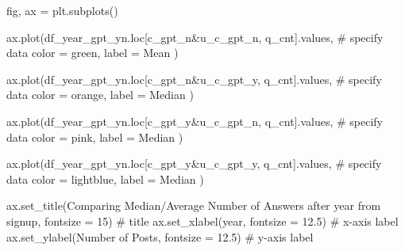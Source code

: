 \documentclass[
  letterpaper,
  DIV=11,
  numbers=noendperiod]{scrartcl}
\newenvironment{Shaded}{\begin{snugshade}}{\end{snugshade}}
\newcommand{\CommentTok}[1]{\textcolor[rgb]{0.37,0.37,0.37}{#1}}
\newcommand{\DecValTok}[1]{\textcolor[rgb]{0.68,0.00,0.00}{#1}}
\newcommand{\FloatTok}[1]{\textcolor[rgb]{0.68,0.00,0.00}{#1}}
\newcommand{\NormalTok}[1]{\textcolor[rgb]{0.00,0.23,0.31}{#1}}
\newcommand{\OperatorTok}[1]{\textcolor[rgb]{0.37,0.37,0.37}{#1}}
\newcommand{\StringTok}[1]{\textcolor[rgb]{0.13,0.47,0.30}{#1}}
\begin{document}
\begin{Shaded}
\begin{Highlighting}[]
\NormalTok{fig, ax }\OperatorTok{=}\NormalTok{ plt.subplots()}


\NormalTok{ax.plot(df\_year\_gpt\_yn.loc[c\_gpt\_n}\OperatorTok{\&}\NormalTok{u\_c\_gpt\_n, }\StringTok{\textquotesingle{}q\_cnt\textquotesingle{}}\NormalTok{].values, }\CommentTok{\# specify data}
\NormalTok{        color }\OperatorTok{=} \StringTok{\textquotesingle{}green\textquotesingle{}}\NormalTok{,}
\NormalTok{        label }\OperatorTok{=} \StringTok{\textquotesingle{}Mean\textquotesingle{}}
\NormalTok{) }

\NormalTok{ax.plot(df\_year\_gpt\_yn.loc[c\_gpt\_n}\OperatorTok{\&}\NormalTok{u\_c\_gpt\_y, }\StringTok{\textquotesingle{}q\_cnt\textquotesingle{}}\NormalTok{].values, }\CommentTok{\# specify data}
\NormalTok{        color }\OperatorTok{=} \StringTok{\textquotesingle{}orange\textquotesingle{}}\NormalTok{,}
\NormalTok{        label }\OperatorTok{=} \StringTok{\textquotesingle{}Median\textquotesingle{}}
\NormalTok{) }

\NormalTok{ax.plot(df\_year\_gpt\_yn.loc[c\_gpt\_y}\OperatorTok{\&}\NormalTok{u\_c\_gpt\_n, }\StringTok{\textquotesingle{}q\_cnt\textquotesingle{}}\NormalTok{].values, }\CommentTok{\# specify data}
\NormalTok{        color }\OperatorTok{=} \StringTok{\textquotesingle{}pink\textquotesingle{}}\NormalTok{,}
\NormalTok{        label }\OperatorTok{=} \StringTok{\textquotesingle{}Median\textquotesingle{}}
\NormalTok{) }

\NormalTok{ax.plot(df\_year\_gpt\_yn.loc[c\_gpt\_y}\OperatorTok{\&}\NormalTok{u\_c\_gpt\_y, }\StringTok{\textquotesingle{}q\_cnt\textquotesingle{}}\NormalTok{].values, }\CommentTok{\# specify data}
\NormalTok{        color }\OperatorTok{=} \StringTok{\textquotesingle{}lightblue\textquotesingle{}}\NormalTok{,}
\NormalTok{        label }\OperatorTok{=} \StringTok{\textquotesingle{}Median\textquotesingle{}}
\NormalTok{) }



\NormalTok{ax.set\_title(}\StringTok{\textquotesingle{}Comparing Median/Average Number of Answers after year from signup\textquotesingle{}}\NormalTok{, fontsize }\OperatorTok{=} \DecValTok{15}\NormalTok{) }\CommentTok{\# title}
\NormalTok{ax.set\_xlabel(}\StringTok{\textquotesingle{}year\textquotesingle{}}\NormalTok{, fontsize }\OperatorTok{=} \FloatTok{12.5}\NormalTok{) }\CommentTok{\# x{-}axis label}
\NormalTok{ax.set\_ylabel(}\StringTok{\textquotesingle{}Number of Posts\textquotesingle{}}\NormalTok{, fontsize }\OperatorTok{=} \FloatTok{12.5}\NormalTok{) }\CommentTok{\# y{-}axis label}


\end{Highlighting}
\end{Shaded}
\end{document}
